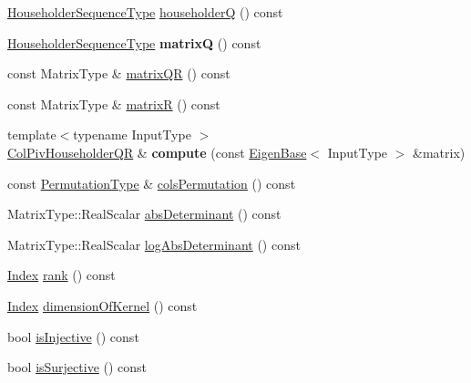 \begin{DoxyCompactItemize}
\item 
\hyperlink{group___householder___module_class_eigen_1_1_householder_sequence}{Householder\+Sequence\+Type} \hyperlink{group___q_r___module_a28ab9d8916ca609c5469c4c192fbfa28}{householderQ} () const
\item 
\mbox{\label{group___q_r___module_a8d7cb1ac2cbb00a283f59f6d26ae763c}} 
\hyperlink{group___householder___module_class_eigen_1_1_householder_sequence}{Householder\+Sequence\+Type} {\bfseries matrixQ} () const
\item 
const Matrix\+Type \& \hyperlink{group___q_r___module_aa572ac050c8d4fadd4f08a87f6b1e62b}{matrix\+QR} () const
\item 
const Matrix\+Type \& \hyperlink{group___q_r___module_a44c534d47bde6b67ce4b5247d142ef30}{matrixR} () const
\item 
\mbox{\label{group___q_r___module_a1cf5d190eae8bdea76a850a5374c4b0c}} 
{\footnotesize template$<$typename Input\+Type $>$ }\\\hyperlink{group___q_r___module_class_eigen_1_1_col_piv_householder_q_r}{Col\+Piv\+Householder\+QR} \& {\bfseries compute} (const \hyperlink{group___core___module_struct_eigen_1_1_eigen_base}{Eigen\+Base}$<$ Input\+Type $>$ \&matrix)
\item 
const \hyperlink{group___core___module}{Permutation\+Type} \& \hyperlink{group___q_r___module_ab6ad43e6a6fb75726eae0d5499948f4a}{cols\+Permutation} () const
\item 
Matrix\+Type\+::\+Real\+Scalar \hyperlink{group___q_r___module_ac87c3bf42098d6f7324dafbc50fa83f7}{abs\+Determinant} () const
\item 
Matrix\+Type\+::\+Real\+Scalar \hyperlink{group___q_r___module_afdc29438a335871f67449c253369ce12}{log\+Abs\+Determinant} () const
\item 
\hyperlink{namespace_eigen_a62e77e0933482dafde8fe197d9a2cfde}{Index} \hyperlink{group___q_r___module_a2a59aaa689613ce5ef0c9130ad33940e}{rank} () const
\item 
\hyperlink{namespace_eigen_a62e77e0933482dafde8fe197d9a2cfde}{Index} \hyperlink{group___q_r___module_a7c9294565d179226133770160b827be1}{dimension\+Of\+Kernel} () const
\item 
bool \hyperlink{group___q_r___module_a0031998053c9c7345c9458f7443aa263}{is\+Injective} () const
\item 
bool \hyperlink{group___q_r___module_a87a7d06e0b0479e5b56b19c2a4f56365}{is\+Surjective} () const

\end{DoxyCompactItemize}
